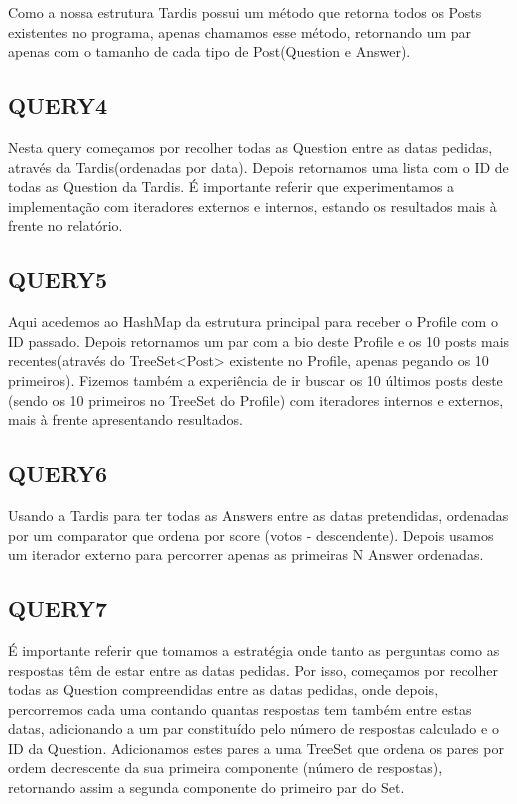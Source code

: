 \documentclass[letterpaper, 10 pt, conference]{IEEEtran} %
\begin{document}
Como a nossa estrutura Tardis possui um método que retorna todos os Posts existentes no programa, apenas chamamos esse método,
retornando um par apenas com o tamanho de cada tipo de Post(Question e Answer).

\subsection{QUERY4}

Nesta query começamos por recolher todas as Question entre as datas pedidas, através da Tardis(ordenadas por data).
Depois retornamos uma lista com o ID de todas as Question da Tardis.
\newline
É importante referir que experimentamos a implementação com iteradores externos e internos, estando os resultados mais à frente
no relatório.

\subsection{QUERY5}

Aqui acedemos ao HashMap da estrutura principal para receber o Profile com o ID passado. Depois retornamos um par com a bio deste Profile e os
10 posts mais recentes(através do TreeSet<Post> existente no Profile, apenas pegando os 10 primeiros).
Fizemos também a experiência de ir buscar os 10 últimos posts deste (sendo os 10 primeiros no TreeSet do Profile) com
iteradores internos e externos, mais à frente apresentando resultados.

\subsection{QUERY6}

Usando a Tardis para ter todas as Answers entre as datas pretendidas, ordenadas por um comparator 
que ordena por score (votos - descendente). Depois usamos um iterador externo para percorrer apenas as primeiras N Answer ordenadas.

\subsection{QUERY7}

É importante referir que tomamos a estratégia onde tanto as perguntas como as respostas têm de estar entre as datas pedidas.
Por isso, começamos por recolher todas as Question compreendidas entre as datas pedidas, onde depois, percorremos cada uma contando quantas respostas tem também entre estas datas,
adicionando a um par constituído pelo número de respostas calculado e o ID da Question. Adicionamos estes pares
a uma TreeSet que ordena os pares por ordem decrescente da sua primeira componente (número de respostas),
retornando assim a segunda componente do primeiro par do Set.
\end{document}

